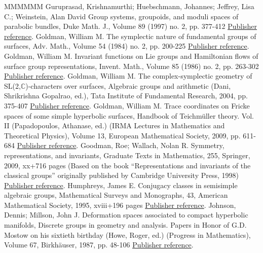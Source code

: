 \documentclass[11pt]{article}
\theoremstyle{definition}
\numberwithin{equation}{section}
\numberwithin{figure}{section}
\numberwithin{table}{section}
\begin{document}
\begin{thebibliography}{MMMMMM}
 Guruprasad, Krishnamurthi; Huebschmann, Johannes; Jeffrey, Lisa C.; Weinstein, Alan David Group systems, groupoids, and moduli spaces of parabolic bundles, Duke Math. J., Volume 89 (1997) no. 2, pp. 377-412 \href{https://ahl.centre-mersenne.org/item/AHL_2020__3__341_0/#GHJW}{Publisher reference}.
 Goldman, William M. The symplectic nature of fundamental groups of surfaces, Adv. Math., Volume 54 (1984) no. 2, pp. 200-225 \href{https://ahl.centre-mersenne.org/item/AHL_2020__3__341_0/#GoldmanAdvances}{Publisher reference}.
 Goldman, William M. Invariant functions on Lie groups and Hamiltonian flows of surface group representations, Invent. Math., Volume 85 (1986) no. 2, pp. 263-302 \href{https://ahl.centre-mersenne.org/item/AHL_2020__3__341_0/#GoldmanHamiltonian}{Publisher reference}.
 Goldman, William M. The complex-symplectic geometry of SL(2,\(\mathbb{C}\))-characters over surfaces, Algebraic groups and arithmetic (Dani, Shrikrishna Gopalrao, ed.), Tata Institute of Fundamental Research, 2004, pp. 375-407 \href{https://ahl.centre-mersenne.org/item/AHL_2020__3__341_0/#GoldmanComplex}{Publisher reference}.
 Goldman, William M. Trace coordinates on Fricke spaces of some simple hyperbolic surfaces, Handbook of Teichmüller theory. Vol. II (Papadopoulos, Athanase, ed.) (IRMA Lectures in Mathematics and Theoretical Physics), Volume 13, European Mathematical Society, 2009, pp. 611-684 \href{https://ahl.centre-mersenne.org/item/AHL_2020__3__341_0/#Goldman09}{Publisher reference}.
 Goodman, Roe; Wallach, Nolan R. Symmetry, representations, and invariants, Graduate Texts in Mathematics, 255, Springer, 2009, xx+716 pages (Based on the book “Representations and invariants of the classical groups” originally published by Cambridge University Press, 1998) \href{https://ahl.centre-mersenne.org/item/AHL_2020__3__341_0/#GoodWall}{Publisher reference}.
 Humphreys, James E. Conjugacy classes in semisimple algebraic groups, Mathematical Surveys and Monographs, 43, American Mathematical Society, 1995, xviii+196 pages \href{https://ahl.centre-mersenne.org/item/AHL_2020__3__341_0/#Humphreys}{Publisher reference}.
 Johnson, Dennis; Millson, John J. Deformation spaces associated to compact hyperbolic manifolds, Discrete groups in geometry and analysis. Papers in Honor of G.D. Mostow on his sixtieth birthday (Howe, Roger, ed.) (Progress in Mathematics), Volume 67, Birkhäuser, 1987, pp. 48-106 \href{https://ahl.centre-mersenne.org/item/AHL_2020__3__341_0/#JohnsonMillson}{Publisher reference}.

\end{thebibliography}
\end{document}
